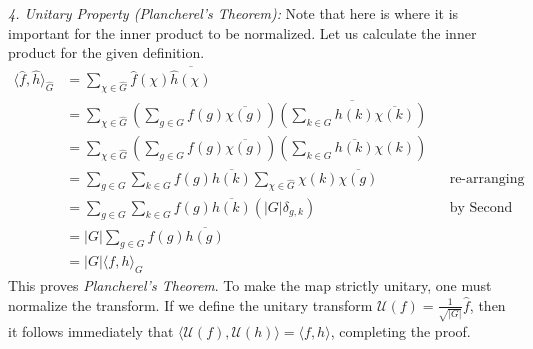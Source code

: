 \documentclass{article}
\begin{document}
\begin{Proof}
\begin{enumerate}
		\textit{4. Unitary Property (Plancherel's Theorem):} Note that here is where it is important for the
		inner product to be normalized. Let us calculate the inner product for the given definition.
		\begin{align*}
			\langle \hat{f}, \hat{h} \rangle_{\hat{G}} &= \sum_{\chi \in \hat{G}} \hat{f}(\chi) \overline{\hat{h}(\chi)} \\
			&= \sum_{\chi \in \hat{G}} \left(\sum_{g \in G} f(g)\overline{\chi(g)}\right) \overline{\left(\sum_{k \in G} h(k)\overline{\chi(k)}\right)} \\
			&= \sum_{\chi \in \hat{G}} \left(\sum_{g \in G} f(g)\overline{\chi(g)}\right) \left(\sum_{k \in G} \overline{h(k)}\chi(k)\right) \\
			&= \sum_{g \in G}\sum_{k \in G} f(g)\overline{h(k)} \sum_{\chi \in \hat{G}} \chi(k)\overline{\chi(g)} && \text{re-arranging terms}\\
			&= \sum_{g \in G}\sum_{k \in G} f(g)\overline{h(k)} (|G|\delta_{g,k}) && \text{by Second Orthogonality} \\
			&= |G|\sum_{g \in G} f(g)\overline{h(g)} \\
			&= |G|\langle f, h \rangle_G
		\end{align*}
		This proves \emph{Plancherel's Theorem}. To make the map strictly unitary, one must normalize the
		transform. If we define the unitary transform $\mathcal{U}(f) = \frac{1}{\sqrt{|G|}}\hat{f}$, then it
		follows immediately that $\langle \mathcal{U}(f), \mathcal{U}(h) \rangle = \langle f,h \rangle$,
		completing the proof.
	\end{enumerate}
\end{Proof}
\end{document}
